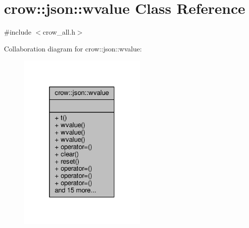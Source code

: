 \hypertarget{classcrow_1_1json_1_1wvalue}{\section{crow\-:\-:json\-:\-:wvalue Class Reference}
\label{classcrow_1_1json_1_1wvalue}
}


{\ttfamily \#include $<$crow\-\_\-all.\-h$>$}



Collaboration diagram for crow\-:\-:json\-:\-:wvalue\-:
\nopagebreak
\begin{figure}[H]
\begin{center}
\leavevmode
\includegraphics[width=176pt]{classcrow_1_1json_1_1wvalue__coll__graph}
\end{center}
\end{figure}
